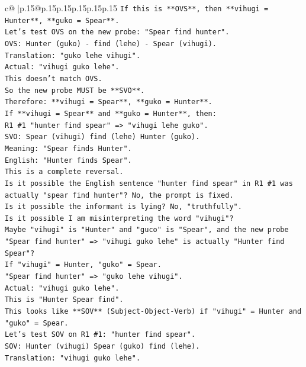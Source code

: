 \documentclass{article}
\begin{document}
{\begin{supertabular}{c@{$\;$}|p{.15\linewidth}@{}p{.15\linewidth}p{.15\linewidth}p{.15\linewidth}p{.15\linewidth}p{.15\linewidth}}
{{{\texttt{If this is **OVS**, then **vihugi = Hunter**, **guko = Spear**.} \\
\texttt{Let's test OVS on the new probe: "Spear find hunter".} \\
\texttt{OVS: Hunter (guko) {-} find (lehe) {-} Spear (vihugi).} \\
\texttt{Translation: "guko lehe vihugi".} \\
\texttt{Actual: "vihugi guko lehe".} \\
\texttt{This doesn't match OVS.} \\
\texttt{So the new probe MUST be **SVO**.} \\
\texttt{Therefore: **vihugi = Spear**, **guko = Hunter**.} \\
\texttt{If **vihugi = Spear** and **guko = Hunter**, then:} \\
\texttt{R1 \#1 "hunter find spear" => "vihugi lehe guko".} \\
\texttt{SVO: Spear (vihugi) find (lehe) Hunter (guko).} \\
\texttt{Meaning: "Spear finds Hunter".} \\
\texttt{English: "Hunter finds Spear".} \\
\texttt{This is a complete reversal.} \\
\texttt{Is it possible the English sentence "hunter find spear" in R1 \#1 was actually "spear find hunter"? No, the prompt is fixed.} \\
\texttt{Is it possible the informant is lying? No, "truthfully".} \\
\texttt{Is it possible I am misinterpreting the word "vihugi"?} \\
\texttt{Maybe "vihugi" is "Hunter" and "guco" is "Spear", and the new probe "Spear find hunter" => "vihugi guko lehe" is actually "Hunter find Spear"?} \\
\texttt{If "vihugi" = Hunter, "guko" = Spear.} \\
\texttt{"Spear find hunter" => "guko lehe vihugi".} \\
\texttt{Actual: "vihugi guko lehe".} \\
\texttt{This is "Hunter Spear find".} \\
\texttt{This looks like **SOV** (Subject{-}Object{-}Verb) if "vihugi" = Hunter and "guko" = Spear.} \\
\texttt{Let's test SOV on R1 \#1: "hunter find spear".} \\
\texttt{SOV: Hunter (vihugi) Spear (guko) find (lehe).} \\
\texttt{Translation: "vihugi guko lehe".} \\
}}}
\end{supertabular}}
\end{document}
